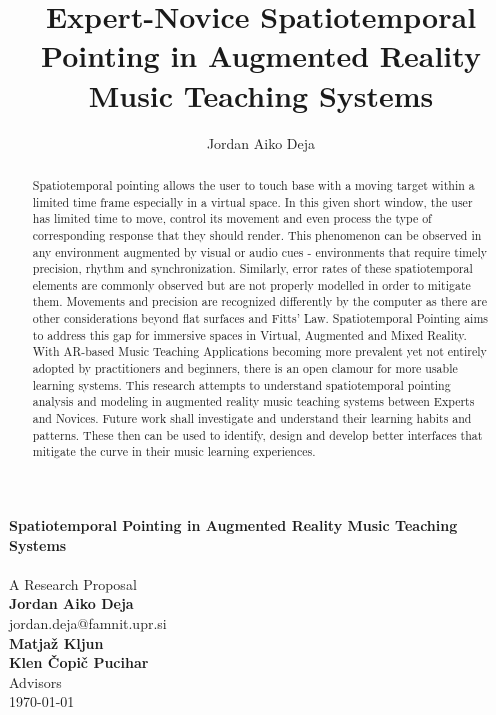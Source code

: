 \documentclass{article}
\title{Expert-Novice Spatiotemporal Pointing in Augmented Reality Music Teaching Systems}
\author{Jordan Aiko Deja}
\begin{document}
\begin{center}
\large \textbf{Spatiotemporal Pointing in Augmented Reality Music Teaching Systems}
\\            
\vspace{0.5cm}\\
A Research Proposal\\
\vspace{0.5cm}
\textbf{Jordan Aiko Deja}\\
jordan.deja@famnit.upr.si\\
\vspace{0.5cm}
\textbf{Matjaž Kljun\\
Klen Čopič Pucihar}\\
Advisors\\
\vspace{0.5cm}
\today
\vspace{0.5cm}
\end{center}

\begin{abstract}
     Spatiotemporal pointing allows the user to touch base with a moving target within a limited time frame especially in a virtual space. In this given short window, the user has limited time to move, control its movement and even process the type of corresponding response that they should render. This phenomenon can be observed in any environment augmented by visual or audio cues - environments that require timely precision, rhythm and synchronization. Similarly, error rates of these spatiotemporal elements are commonly observed but are not properly modelled in order to mitigate them. Movements and precision are recognized differently by the computer as there are other considerations beyond flat surfaces and Fitts' Law. Spatiotemporal Pointing aims to address this gap for immersive spaces in Virtual, Augmented and Mixed Reality. With AR-based Music Teaching Applications becoming more prevalent yet not entirely adopted by practitioners and beginners, there is an open clamour for more usable learning systems. This research attempts to understand spatiotemporal pointing analysis and modeling in augmented reality music teaching systems between Experts and Novices. Future work shall investigate and understand their learning habits and patterns.  These then can be used to identify, design and develop better interfaces that mitigate the curve in their music learning experiences. 
\end{abstract}
\end{document}
